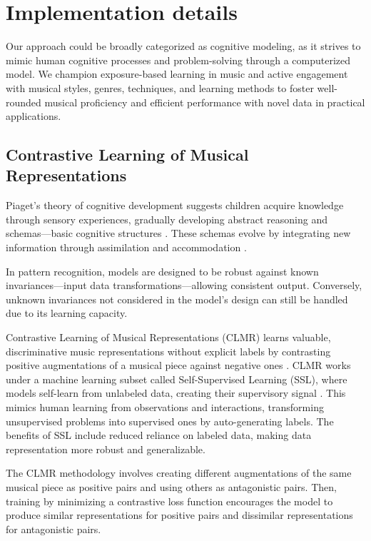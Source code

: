 \section{Implementation details}

Our approach could be broadly categorized as cognitive modeling, as it strives to mimic human cognitive processes and problem-solving through a computerized model. We champion exposure-based learning in music and active engagement with musical styles, genres, techniques, and learning methods to foster well-rounded musical proficiency and efficient performance with novel data in practical applications.

\subsection{Contrastive Learning of Musical Representations}

Piaget's theory of cognitive development suggests children acquire knowledge through sensory experiences, gradually developing abstract reasoning and schemas—basic cognitive structures \cite{Huitt2003PiagetsDevelopment}. These schemas evolve by integrating new information through assimilation and accommodation \cite{audioselfsupsurvey}.

In pattern recognition, models are designed to be robust against known invariances—input data transformations—allowing consistent output. Conversely, unknown invariances not considered in the model's design can still be handled due to its learning capacity.

Contrastive Learning of Musical Representations (CLMR) learns valuable, discriminative music representations without explicit labels by contrasting positive augmentations of a musical piece against negative ones \cite{CLMR2021}. CLMR works under a machine learning subset called Self-Supervised Learning (SSL), where models self-learn from unlabeled data, creating their supervisory signal \cite{audioselfsupsurvey}. This mimics human learning from observations and interactions, transforming unsupervised problems into supervised ones by auto-generating labels. The benefits of SSL include reduced reliance on labeled data, making data representation more robust and generalizable.

The CLMR methodology involves creating different augmentations of the same musical piece as positive pairs and using others as antagonistic pairs. Then, training by minimizing a contrastive loss function encourages the model to produce similar representations for positive pairs and dissimilar representations for antagonistic pairs.


